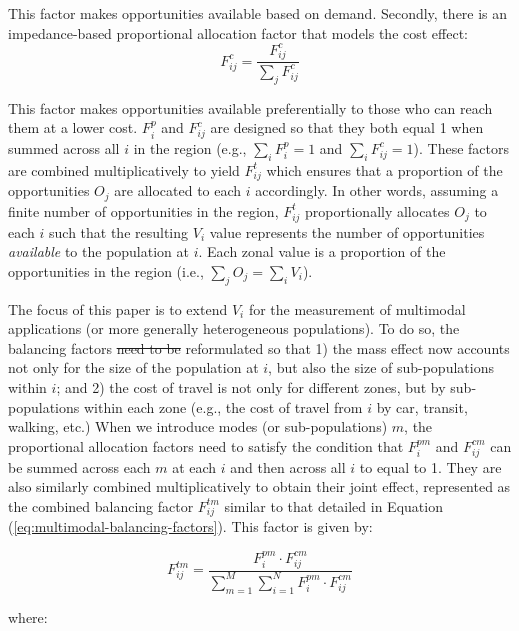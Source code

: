\documentclass[10pt,letterpaper]{article}
\providecommand{\DIFaddtex}[1]{{\protect\color{blue}\uwave{#1}}} %
\providecommand{\DIFdeltex}[1]{{\protect\color{red}\sout{#1}}}                      %
\providecommand{\DIFaddbegin}{} %
\providecommand{\DIFaddend}{} %
\providecommand{\DIFdelbegin}{} %
\providecommand{\DIFdelend}{} %
\providecommand{\DIFadd}[1]{\texorpdfstring{\DIFaddtex{#1}}{#1}} %
\providecommand{\DIFdel}[1]{\texorpdfstring{\DIFdeltex{#1}}{}} %
\newcommand{\DIFscaledelfig}{0.5}
\newlength{\DIFdelgraphicswidth} %
\newlength{\DIFdelgraphicsheight} %
\newcommand{\DIFaddincludegraphics}[2][]{{\color{blue}\fbox{\DIFOincludegraphics[#1]{#2}}}} %
\newcommand{\DIFdelincludegraphics}[2][]{%
\sbox{\DIFdelgraphicsbox}{\DIFOincludegraphics[#1]{#2}}%
\settoboxwidth{\DIFdelgraphicswidth}{\DIFdelgraphicsbox} %
\settoboxtotalheight{\DIFdelgraphicsheight}{\DIFdelgraphicsbox} %
\scalebox{\DIFscaledelfig}{%
\parbox[b]{\DIFdelgraphicswidth}{\usebox{\DIFdelgraphicsbox}\\[-\baselineskip] \rule{\DIFdelgraphicswidth}{0em}}\llap{\resizebox{\DIFdelgraphicswidth}{\DIFdelgraphicsheight}{%
\setlength{\unitlength}{\DIFdelgraphicswidth}%
\begin{picture}(1,1)%
\thicklines\linethickness{2pt} %
{\color[rgb]{1,0,0}\put(0,0){\framebox(1,1){}}}%
{\color[rgb]{1,0,0}\put(0,0){\line( 1,1){1}}}%
{\color[rgb]{1,0,0}\put(0,1){\line(1,-1){1}}}%
\end{picture}%
}\hspace*{3pt}}} %
} %
\DeclareRobustCommand{\DIFaddbegin}{\DIFOaddbegin \let\includegraphics\DIFaddincludegraphics} %
\DeclareRobustCommand{\DIFaddend}{\DIFOaddend \let\includegraphics\DIFOincludegraphics} %
\DeclareRobustCommand{\DIFdelbegin}{\DIFOdelbegin \let\includegraphics\DIFdelincludegraphics} %
\DeclareRobustCommand{\DIFdelend}{\DIFOaddend \let\includegraphics\DIFOincludegraphics} %
\begin{document}
This factor makes opportunities available based on demand. Secondly,
there is an impedance-based proportional allocation factor that models
the cost effect: \[
F^c_{ij} = \frac{F^c_{ij}}{\sum_j F^c_{ij}}
\]

This factor makes opportunities available preferentially to those who
can reach them at a lower cost. \(F^p_{i}\) and \(F^c_{ij}\) are
designed so that they both equal 1 when summed across all \(i\) in the
region (e.g., \(\sum_i F^p_{i} = 1\) and \(\sum_i F^c_{ij} = 1\)). These
factors are combined multiplicatively to yield \(F^t_{ij}\) which
ensures that a proportion of the opportunities \(O_j\) are allocated to
each \(i\) accordingly. In other words, assuming a finite number of
opportunities in the region, \(F^t_{ij}\) proportionally allocates
\(O_j\) to each \(i\) such that the resulting \(V_i\) value represents
the number of opportunities \emph{available} to the population at \(i\).
Each zonal value is a proportion of the opportunities in the region
(i.e., \(\sum_j O_j = \sum_i V_i\)).

The focus of this paper is to extend \(V_i\) for the measurement of
multimodal applications (or more generally heterogeneous populations).
To do so, the balancing factors \DIFdelbegin \DIFdel{need to be }\DIFdelend \DIFaddbegin \DIFadd{are }\DIFaddend reformulated so that 1) the mass
effect now accounts not only for the size of the population at \(i\),
but also the size of sub-populations within \(i\); and 2) the cost of
travel is not only for different zones, but by sub-populations within
each zone (e.g., the cost of travel from \(i\) by car, transit, walking,
etc.) \DIFaddbegin \DIFadd{relative to all zones. }\DIFaddend When we introduce modes (or
sub-populations) \(m\), the proportional allocation factors need to
satisfy the condition that \(F^{pm}_{i}\) and \(F^{cm}_{ij}\) can be
summed across each \(m\) at each \(i\) and then across all \(i\) to
equal to 1. They are also similarly combined multiplicatively to obtain
their joint effect, represented as the combined balancing factor
\(F^{tm}_{ij}\) similar to that detailed in Equation
(\ref{eq:multimodal-balancing-factors}). This factor is given by:

\begin{equation}
\label{eq:multimodal-balancing-factors}
F^{tm}_{ij} = \frac{F^{pm}_{i} \cdot F^{cm}_{ij}}{\sum_{m=1}^M \sum_{i=1}^N F^{pm}_{i} \cdot F^{cm}_{ij}}
\end{equation}

\noindent where:
\end{document}
